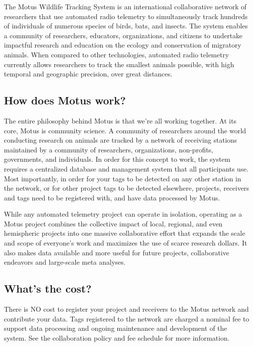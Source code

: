 \documentclass[
]{article}
\begin{document}
The Motus Wildlife Tracking System is an international collaborative
network of researchers that use automated radio telemetry to
simultaneously track hundreds of individuals of numerous species of
birds, bats, and insects. The system enables a community of researchers,
educators, organizations, and citizens to undertake impactful research
and education on the ecology and conservation of migratory animals. When
compared to other technologies, automated radio telemetry currently
allows researchers to track the smallest animals possible, with high
temporal and geographic precision, over great distances.

\hypertarget{how-does-motus-work}{%
\subsection{How does Motus work?}\label{how-does-motus-work}}

The entire philosophy behind Motus is that we're all working together.
At its core, Motus is community science. A community of researchers
around the world conducting research on animals are tracked by a network
of receiving stations maintained by a community of researchers,
organizations, non-profits, governments, and individuals. In order for
this concept to work, the system requires a centralized database and
management system that all participants use. Most importantly, in order
for your tags to be detected on any other station in the network, or for
other project tags to be detected elsewhere, projects, receivers and
tags need to be registered with, and have data processed by Motus.

While any automated telemetry project can operate in isolation,
operating as a Motus project combines the collective impact of local,
regional, and even hemispheric projects into one massive collaborative
effort that expands the scale and scope of everyone's work and maximizes
the use of scarce research dollars. It also makes data available and
more useful for future projects, collaborative endeavors and large-scale
meta analyses.

\hypertarget{whats-the-cost}{%
\subsection{What's the cost?}\label{whats-the-cost}}

There is NO cost to register your project and receivers to the Motus
network and contribute your data. Tags registered to the network are
charged a nominal fee to support data processing and ongoing maintenance
and development of the system. See the collaboration policy and fee
schedule for more information.
\end{document}
